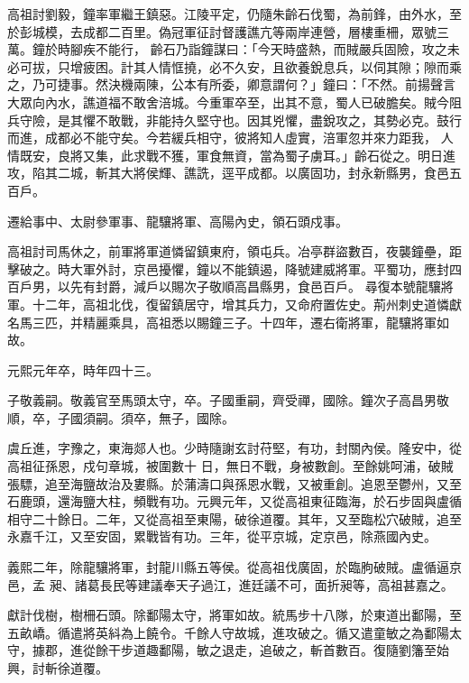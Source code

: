 \begin{pinyinscope}
 高祖討劉毅，鐘率軍繼王鎮惡。江陵平定，仍隨朱齡石伐蜀，為前鋒，由外水，至於彭城模，去成都二百里。偽冠軍征討督護譙亢等兩岸連營，層樓重柵，眾號三萬。鐘於時腳疾不能行，
 齡石乃詣鐘謀曰：「今天時盛熱，而賊嚴兵固險，攻之未必可拔，只增疲困。計其人情恇撓，必不久安，且欲養銳息兵，以伺其隙；隙而乘之，乃可捷事。然決機兩陳，公本有所委，卿意謂何？」鐘曰：「不然。前揚聲言大眾向內水，譙道福不敢舍涪城。今重軍卒至，出其不意，蜀人已破膽矣。賊今阻兵守險，是其懼不敢戰，非能持久堅守也。因其兇懼，盡銳攻之，其勢必克。鼓行而進，成都必不能守矣。今若緩兵相守，彼將知人虛實，涪軍忽并來力距我，
 人情既安，良將又集，此求戰不獲，軍食無資，當為蜀子虜耳。」齡石從之。明日進攻，陷其二城，斬其大將侯輝、譙詵，逕平成都。以廣固功，封永新縣男，食邑五百戶。



 遷給事中、太尉參軍事、龍驤將軍、高陽內史，領石頭戍事。



 高祖討司馬休之，前軍將軍道憐留鎮東府，領屯兵。冶亭群盜數百，夜襲鐘壘，距擊破之。時大軍外討，京邑擾懼，鐘以不能鎮遏，降號建威將軍。平蜀功，應封四百戶男，以先有封爵，減戶以賜次子敬順高昌縣男，食邑百戶。
 尋復本號龍驤將軍。十二年，高祖北伐，復留鎮居守，增其兵力，又命府置佐史。荊州刺史道憐獻名馬三匹，并精麗乘具，高祖悉以賜鐘三子。十四年，遷右衛將軍，龍驤將軍如故。



 元熙元年卒，時年四十三。



 子敬義嗣。敬義官至馬頭太守，卒。子國重嗣，齊受禪，國除。鐘次子高昌男敬順，卒，子國須嗣。須卒，無子，國除。



 虞丘進，字豫之，東海郯人也。少時隨謝玄討苻堅，有功，封關內侯。隆安中，從高祖征孫恩，戍句章城，被圍數十
 日，無日不戰，身被數創。至餘姚呵浦，破賊張驃，追至海鹽故治及婁縣。於蒲濤口與孫恩水戰，又被重創。追恩至鬱州，又至石鹿頭，還海鹽大柱，頻戰有功。元興元年，又從高祖東征臨海，於石步固與盧循相守二十餘日。二年，又從高祖至東陽，破徐道覆。其年，又至臨松穴破賊，追至永嘉千江，又至安固，累戰皆有功。三年，從平京城，定京邑，除燕國內史。



 義熙二年，除龍驤將軍，封龍川縣五等侯。從高祖伐廣固，於臨朐破賊。盧循逼京邑，孟
 昶、諸葛長民等建議奉天子過江，進廷議不可，面折昶等，高祖甚嘉之。



 獻計伐樹，樹柵石頭。除鄱陽太守，將軍如故。統馬步十八隊，於東道出鄱陽，至五畝嶠。循遣將英紏為上饒令。千餘人守故城，進攻破之。循又遣童敏之為鄱陽太守，據郡，進從餘干步道趣鄱陽，敏之退走，追破之，斬首數百。復隨劉籓至始興，討斬徐道覆。




\end{pinyinscope}
